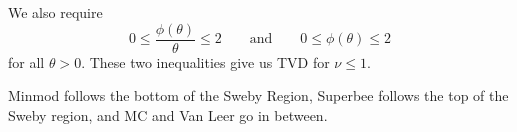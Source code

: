 \documentclass{article}
\begin{document}
    We also require $$0 \leq \frac{\phi(\theta)}{\theta} \leq 2 \qquad\text{and}\qquad 0 \leq\phi(\theta)\leq 2$$ for all $\theta > 0$.  These two inequalities give us TVD for $\nu \leq 1$.

    \begin{figure}[ht!]
        \centering
    \end{figure}
    \FloatBarrier
    Minmod follows the bottom of the Sweby Region, Superbee follows the top of the Sweby region, and MC and Van Leer go in between.
\end{document}
